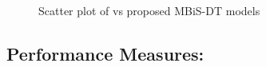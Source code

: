 \documentclass[sn-mathphys,Numbered]{sn-jnl}
\theoremstyle{thmstyleone}
\theoremstyle{thmstyletwo}
\theoremstyle{thmstylethree}
\begin{document}
\begin{figure}[ht!]
  \hfill
    \caption{Scatter plot of vs proposed MBiS-DT models}
    \label{fig:Scatter plot of vs proposed MBiS-DT models}
  \end{figure}








\subsection{Performance Measures:}
\end{document}
